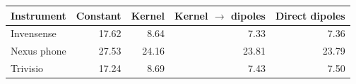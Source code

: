 \begin{tabular}{@{}lrrrr@{}}
\toprule
Instrument & Constant & Kernel & Kernel $\to$ dipoles & Direct dipoles \\
\midrule
Invensense & 17.62 & 8.64 & 7.33 & 7.36 \\
Nexus phone & 27.53 & 24.16 & 23.81 & 23.79 \\
Trivisio & 17.24 & 8.69 & 7.43 & 7.50 \\
\bottomrule
\end{tabular}
